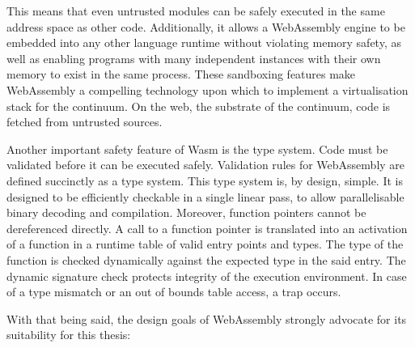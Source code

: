This means that even untrusted modules can be safely executed in the same address space as other code. Additionally, it allows a WebAssembly engine to be embedded into any other language runtime without violating memory safety, as well as enabling programs with many independent instances with their own memory to exist in the same process. These sandboxing features make WebAssembly a compelling technology upon which to implement a virtualisation stack for the continuum. On the web, the substrate of the continuum, code is fetched from untrusted sources.

Another important safety feature of Wasm is the type system. Code must be validated before it can be executed safely. Validation rules for WebAssembly are defined succinctly as a type system. This type system is, by design, simple. It is designed to be efficiently checkable in a single linear pass, to allow parallelisable binary decoding and compilation. Moreover, function pointers cannot be dereferenced directly. A call to a function pointer is translated into an activation of a function in a runtime table of valid entry points and types. The type of the function is checked dynamically against the expected type in the said entry. The dynamic signature check protects integrity of the execution environment. In case of a type mismatch or an out of bounds table access, a trap occurs.

With that being said, the design goals of WebAssembly strongly advocate for its suitability for this thesis:

